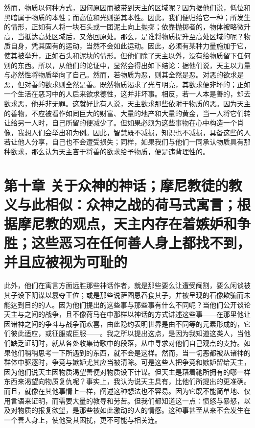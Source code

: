 然而，物质以何种方式，因何原因而被带到天主的区域呢？因为据他们说，低位和黑暗属于物质的本性；而高位和光则逆其本性。因此，我们便归给它一种；所发生的情形，正如有人将一块石头或一团泥土向上抛掷；依靠抛掷者的，物体被略微升高，当抵达高处区域后，又落回原处。那么，是谁将物质提升至高处区域的呢？物质自身，凭其固有的运动，当然不会如此运动。因此，必须有某种力量施加于它，使其被举升，正如石头和泥块的情形。但他们除了天主以外，没有给物质留下任何别的东西。所以，从他们的论证中，显然会得出如下结论：据他们说，天主以力量与必然性将物质举向了自己。然而，若物质为恶，则其全然是恶。对恶的欲求是恶，但对善的欲求则全然是善。既然物质渴求了光与明亮，其欲求便非坏的；正如一个生活在恶习中的人后来欲求德性，这并非坏事。相反，若一人本是善的，却去欲求恶，他并非无罪。这就好比有人说，天主欲求那些依附于物质的恶。因为天主的善物，不应被看作如同巨大的财富、大量的地产和大量的黄金，当一人将它们转让给另一人时，自己所留的便减少了。但如果必须为这些事物在心中构造一个肖像，我想人们会举出和为例。因此，智慧既不减损，知识也不减损，具备这些的人若让他人分享，自己也不会遭受损失；同样，如果我们与他们一同承认物质具有那种欲求，那么认为天主吝于将善的欲求给予物质，便是违背理性的。\par


\section{第十章 关于众神的神话；摩尼教徒的教义与此相似：众神之战的荷马式寓言；根据摩尼教的观点，天主内存在着嫉妒和争胜；这些恶习在任何善人身上都找不到，并且应被视为可耻的}

此外，他们在寓言方面远胜那些神话作者，就是那些要么让遭受阉割，要么闲谈被其子设下阴谋以篡夺王位；或是那些说萨图恩吞食其子，并被呈现的石像欺骗而未能达到目的的人。因为他们提出的这些事与那些事有什么不同呢？当他们公开谈论天主与之间的战争，且不像荷马在中那样以神话的方式讲述这些事——在那里他让因诸神之间的争斗与战争而欢喜，由此隐约表明世界是由不同等的元素形成的，它们彼此适应，或征服或臣服——。我之所以提出这点，是因为我知道这类人，当他们缺乏证明时，就从各处收集诗歌中的段落，从中寻求对他们自己观点的支持。如果他们稍稍思考一下所遇到的东西，就不会是这样。然而，当一切恶都被从诸神的群体中驱逐时，争竞与嫉妒尤其应当被清除。可是这些人把争竞和嫉妒留给天主，因为他们说天主因物质渴望善便对物质设下计谋。但天主是藉着祂所拥有的哪一样东西来渴望向物质复仇呢？事实上，我认为说天主具有，比他们所提出的更准确。而且，就像在其他事情上一样，阐述这种想法也不容易。因为它既不能简单地、仅用言语来证明，而需要大量的教导和劳苦。但我们都知道这一点：愤怒与暴怒，以及对物质的报复欲望，是那些被如此激动的人的情感。这种事甚至从来不会发生在一个善人身上，使他受其困扰，更不可能与相关连。\par

